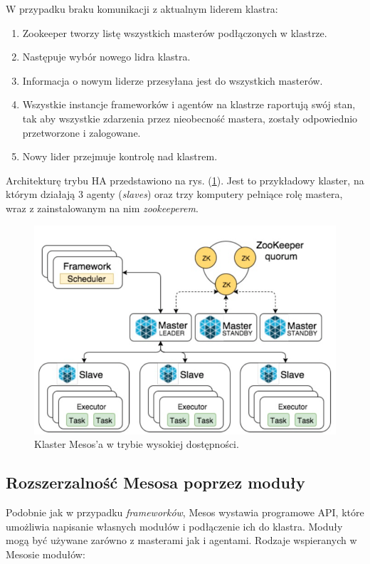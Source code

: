 \documentclass[10pt,a4paper,titlepage,twoside]{report}
\begin{document}
W przypadku braku komunikacji z aktualnym liderem klastra:
\begin{enumerate}
\item Zookeeper tworzy listę wszystkich masterów podłączonych w klastrze.
\item Następuje wybór nowego lidra klastra.
\item Informacja o nowym liderze przesyłana jest do wszystkich masterów.
\item Wszystkie instancje frameworków i agentów na klastrze raportują swój stan, tak aby wszystkie zdarzenia przez nieobecność mastera, zostały odpowiednio przetworzone i zalogowane.
\item Nowy lider przejmuje kontrolę nad klastrem.
\end{enumerate}

Architekturę trybu HA przedstawiono na rys. (\ref{mesos-ha-arch}). Jest to przykładowy klaster, na którym działają 3 agenty (\textit{slaves}) oraz trzy komputery pełniące rolę mastera, wraz z zainstalowanym na nim \textit{zookeeperem}. 
\begin{figure}[!h]
	\centering
	\includegraphics[scale=0.5]{pics/mesos-ha-arch.png}
	\caption{Klaster Mesos'a w trybie wysokiej dostępności.}
	\label{mesos-ha-arch}
\end{figure}

\subsection{Rozszerzalność Mesosa poprzez moduły}

Podobnie jak w przypadku \textit{frameworków}, Mesos wystawia programowe API, które umożliwia napisanie własnych modułów i podłączenie ich do klastra. Moduły mogą być używane zarówno z masterami jak i agentami. Rodzaje wspieranych w Mesosie modułów:
\end{document}
